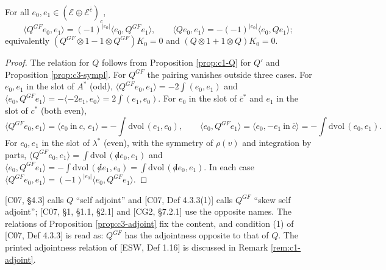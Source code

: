 \begin{proposition}[Adjointness]
\label{prop:c3-adjoint}
For all $e_0,e_1\in(\mathscr E\oplus\mathscr E^{\bar c})_c$,
\[
\langle Q^{GF}e_0,e_1\rangle=(-1)^{|e_0|}\langle e_0,Q^{GF}e_1\rangle,\qquad \langle Qe_0,e_1\rangle=-(-1)^{|e_0|}\langle e_0,Qe_1\rangle ;
\]
equivalently $(Q^{GF}\otimes1-1\otimes Q^{GF})K_0=0$ and $(Q\otimes1+1\otimes Q)K_0=0$.
\end{proposition}

\begin{proof}
The relation for $Q$ follows from Proposition \ref{prop:c1-Q} for $Q'$ and Proposition \ref{prop:c3-sympl}. For $Q^{GF}$ the pairing vanishes outside three cases. For $e_0,e_1$ in the slot of $A^*$ (odd), $\langle Q^{GF}e_0,e_1\rangle=-2\int(e_0,e_1)$ and $\langle e_0,Q^{GF}e_1\rangle=-\langle-2e_1,e_0\rangle=2\int(e_1,e_0)$. For $e_0$ in the slot of $\bar c^*$ and $e_1$ in the slot of $c^*$ (both even),
\[
\langle Q^{GF}e_0,e_1\rangle=\langle e_0\ \text{in}\ c,\,e_1\rangle=-\int\mathrm{dvol}\,(e_1,e_0),\qquad \langle e_0,Q^{GF}e_1\rangle=\langle e_0,-e_1\ \text{in}\ \bar c\rangle=-\int\mathrm{dvol}\,(e_0,e_1).
\]
For $e_0,e_1$ in the slot of $\lambda^*$ (even), with the symmetry of $\rho(v)$ and integration by parts, $\langle Q^{GF}e_0,e_1\rangle=\int\mathrm{dvol}\,({\not d}e_0,e_1)$ and $\langle e_0,Q^{GF}e_1\rangle=-\int\mathrm{dvol}\,({\not d}e_1,e_0)=\int\mathrm{dvol}\,({\not d}e_0,e_1)$. In each case $\langle Q^{GF}e_0,e_1\rangle=(-1)^{|e_0|}\langle e_0,Q^{GF}e_1\rangle$.
\end{proof}

\begin{remark}
\label{rem:c3-names}
[C07, §4.3] calls $Q$ ``self adjoint'' and [C07, Def 4.3.3(1)] calls $Q^{GF}$ ``skew self adjoint''; [C07, §1, §1.1, §2.1] and [CG2, §7.2.1] use the opposite names. The relations of Proposition \ref{prop:c3-adjoint} fix the content, and condition (1) of [C07, Def 4.3.3] is read as: $Q^{GF}$ has the adjointness opposite to that of $Q$. The printed adjointness relation of [ESW, Def 1.16] is discussed in Remark \ref{rem:c1-adjoint}.
\end{remark}

